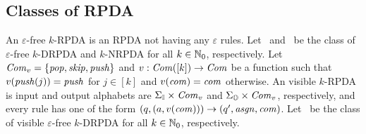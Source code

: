 \subsection{Classes of RPDA}
An $\varepsilon$-free $k$-RPDA is an RPDA not having any $\varepsilon$ rules.
Let \DRPDA\ and \NRPDA\ be the class of $\varepsilon$-free $k$-DRPDA and $k$-NRPDA for all $k\in\mathbb{N}_0$, respectively.
Let $\mathit{Com}_v=\{\mathit{pop},\mathit{skip},\mathit{push}\}$ and $v:\mathit{Com}([k])\to\mathit{Com}$ be a function such that $v(\mathit{push}(j))=\mathit{push}$ for $j\in[k]$ and $v(\mathit{com})=\mathit{com}$ otherwise.
An visible $k$-RPDA is input and output alphabets are $\Sigma_{\mathbb{I}}\times\mathit{Com}_v$ and $\Sigma_{\mathbb{O}}\times\mathit{Com}_v$, respectively,
and every rule has one of the form $(q,(a,v(\mathit{com})))\to(q',\mathit{asgn},\mathit{com})$.
Let \DRPDAv\ be the class of visible $\varepsilon$-free $k$-DRPDA for all $k\in\mathbb{N}_0$, respectively.
